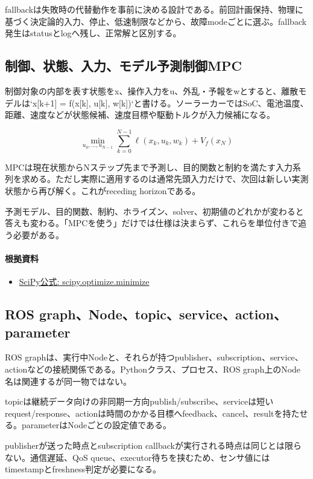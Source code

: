 \documentclass[a4paper,11pt]{article}
\begin{document}
fallbackは失敗時の代替動作を事前に決める設計である。前回計画保持、物理に基づく決定論的入力、停止、低速制限などから、故障modeごとに選ぶ。fallback発生はstatusとlogへ残し、正常解と区別する。



\subsection{制御、状態、入力、モデル予測制御MPC}
制御対象の内部を表す状態をx、操作入力をu、外乱・予報をwとすると、離散モデルは`x[k+1] = f(x[k], u[k], w[k])`と書ける。ソーラーカーではSoC、電池温度、距離、速度などが状態候補、速度目標や駆動トルクが入力候補になる。


\[
\min_{u_0,\ldots,u_{N-1}} \sum_{k=0}^{N-1}\ell(x_k,u_k,w_k)+V_f(x_N)
\]

MPCは現在状態からNステップ先まで予測し、目的関数と制約を満たす入力系列を求める。ただし実際に適用するのは通常先頭入力だけで、次回は新しい実測状態から再び解く。これがreceding horizonである。


予測モデル、目的関数、制約、ホライズン、solver、初期値のどれかが変わると答えも変わる。「MPCを使う」だけでは仕様は決まらず、これらを単位付きで追う必要がある。

\paragraph{根拠資料}
\begin{itemize}[leftmargin=1.6em]
\item \href{https://docs.scipy.org/doc/scipy/reference/generated/scipy.optimize.minimize.html}{SciPy公式: scipy.optimize.minimize}
\end{itemize}

\subsection{ROS graph、Node、topic、service、action、parameter}
ROS graphは、実行中Nodeと、それらが持つpublisher、subscription、service、actionなどの接続関係である。Pythonクラス、プロセス、ROS graph上のNode名は関連するが同一物ではない。


topicは継続データ向けの非同期一方向publish/subscribe、serviceは短いrequest/response、actionは時間のかかる目標へfeedback、cancel、resultを持たせる。parameterはNodeごとの設定値である。


publisherが送った時点とsubscription callbackが実行される時点は同じとは限らない。通信遅延、QoS queue、executor待ちを挟むため、センサ値にはtimestampとfreshness判定が必要になる。
\end{document}
